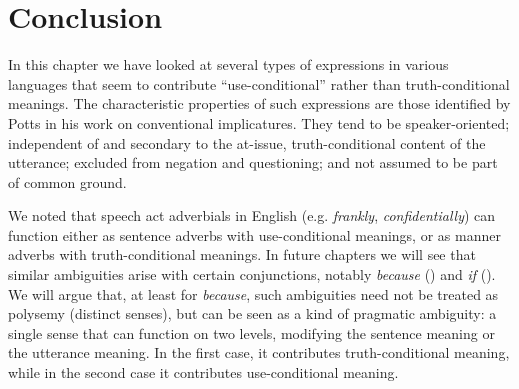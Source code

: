 \section{Conclusion}\label{sec:11.7}

In this chapter we have looked at several types of expressions in various languages that seem to contribute “use-conditional” rather than truth-conditional meanings. The characteristic properties of such expressions are those identified by Potts in his work on conventional implicatures. They tend to be speaker-oriented; independent of and secondary to the at-issue, truth-conditional content of the utterance; excluded from negation and questioning; and not assumed to be part of common ground.



We noted that speech act adverbials in English (e.g. \textit{frankly}, \textit{confidentially}) can function either as sentence adverbs with use-conditional meanings, or as manner adverbs with truth-conditional meanings. In future chapters we will see that similar ambiguities arise with certain conjunctions, notably \textit{because} () and \textit{if} (). We will argue that, at least for \textit{because}, such ambiguities need not be treated as polysemy (distinct senses), but can be seen as a kind of pragmatic ambiguity: a single sense that can function on two levels, modifying the sentence meaning or the utterance meaning. In the first case, it contributes truth-conditional meaning, while in the second case it contributes use-conditional meaning.



